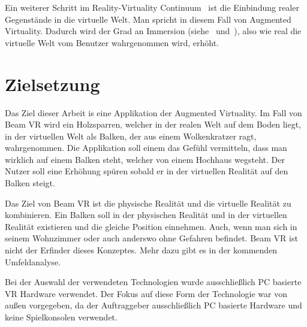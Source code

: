 Ein weiterer Schritt im Reality-Virtuality Continuum~\cite{MILGRAM_1994} ist die Einbindung realer Gegenstände in die virtuelle Welt.
Man spricht in diesem Fall von Augmented Virtuality.
Dadurch wird der Grad an Immersion (siehe~\cite{EMEST_ADAMS_2004} und~\cite{BJOERK_2003}), also wie real die virtuelle Welt vom Benutzer wahrgenommen wird, erhöht.

\section{Zielsetzung}
\label{sec: objective}

Das Ziel dieser Arbeit is eine Applikation der Augmented Virtuality.
Im Fall von Beam VR wird ein Holzsparren, welcher in der realen Welt auf dem Boden liegt, in der virtuellen Welt als Balken, der aus einem Wolkenkratzer ragt, wahrgenommen.
Die Applikation soll einem das Gefühl vermitteln, dass man wirklich auf einem Balken steht, welcher von einem Hochhaus wegsteht.
Der Nutzer soll eine Erhöhung spüren sobald er in der virtuellen Realität auf den Balken steigt.

Das Ziel von Beam VR ist die physische Realität und die virtuelle Realität zu kombinieren.
Ein Balken soll in der physischen Realität und in der virtuellen Realität existieren und die gleiche Position einnehmen.
Auch, wenn man sich in seinem Wohnzimmer oder auch anderswo ohne Gefahren befindet.
Beam VR ist nicht der Erfinder dieses Konzeptes.
Mehr dazu gibt es in der kommenden Umfeldanalyse.

Bei der Auswahl der verwendeten Technologien wurde ausschließlich PC basierte VR Hardware verwendet.
Der Fokus auf diese Form der Technologie war von außen vorgegeben, da der Auftraggeber ausschließlich PC basierte Hardware und keine Spielkonsolen verwendet.
